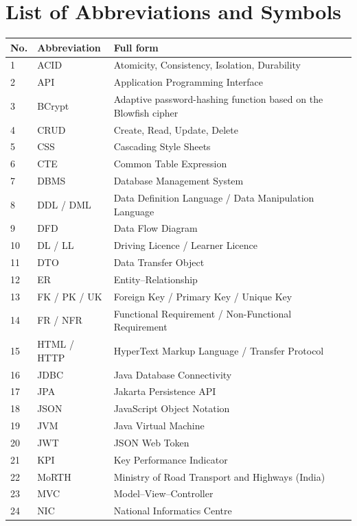 \chapter*{List of Abbreviations and Symbols}
\thispagestyle{plain}
\begingroup\small
\begin{longtable}{@{}p{0.9cm}p{2.9cm}p{9.4cm}@{}}
\toprule \textbf{No.} & \textbf{Abbreviation} & \textbf{Full form} \\ \midrule \endhead
1 & ACID & Atomicity, Consistency, Isolation, Durability\\
2 & API & Application Programming Interface\\
3 & BCrypt & Adaptive password-hashing function based on the Blowfish cipher\\
4 & CRUD & Create, Read, Update, Delete\\
5 & CSS & Cascading Style Sheets\\
6 & CTE & Common Table Expression\\
7 & DBMS & Database Management System\\
8 & DDL / DML & Data Definition Language / Data Manipulation Language\\
9 & DFD & Data Flow Diagram\\
10 & DL / LL & Driving Licence / Learner Licence\\
11 & DTO & Data Transfer Object\\
12 & ER & Entity--Relationship\\
13 & FK / PK / UK & Foreign Key / Primary Key / Unique Key\\
14 & FR / NFR & Functional Requirement / Non-Functional Requirement\\
15 & HTML / HTTP & HyperText Markup Language / Transfer Protocol\\
16 & JDBC & Java Database Connectivity\\
17 & JPA & Jakarta Persistence API\\
18 & JSON & JavaScript Object Notation\\
19 & JVM & Java Virtual Machine\\
20 & JWT & JSON Web Token\\
21 & KPI & Key Performance Indicator\\
22 & MoRTH & Ministry of Road Transport and Highways (India)\\
23 & MVC & Model--View--Controller\\
24 & NIC & National Informatics Centre\\

\end{longtable}
